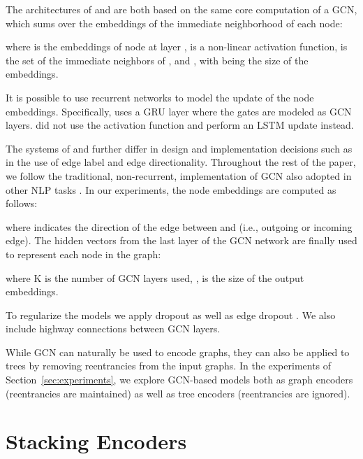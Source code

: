 \documentclass[11pt,a4paper]{article}
\begin{document}
The architectures of  and  are both based on the same core computation of a GCN, which sums over the embeddings of the immediate neighborhood of each node: 

where  is the embeddings of node  at layer ,  is a non-linear activation function,  is the set of the immediate neighbors of ,  and , with  being the size of the embeddings.
  
It is possible to use recurrent networks to model the update of the node embeddings. Specifically,  uses a GRU layer where the gates are modeled as GCN layers. 
 did not use the activation function  and perform an LSTM update instead. 

The systems of  and  further differ in design and implementation decisions such as in the use of edge label and edge directionality. 
Throughout the rest of the paper, we follow the traditional, non-recurrent, implementation of GCN also adopted in other NLP tasks \cite{marcheggiani2017encoding,bastings2017graph,cetoli2017graph}. In our experiments, the node embeddings are computed as follows:

where  indicates the direction of the edge between  and  (i.e., outgoing or incoming edge). 
The hidden vectors from the last layer of the GCN network are finally used to represent each node in the graph:

where K is the number of GCN layers used, ,  is the size of the output embeddings. 

To regularize the models we apply dropout \cite{srivastava2014dropout} as well as edge dropout \cite{marcheggiani2017encoding}. We also include highway connections \cite{srivastava2015highway} between GCN layers. 


While GCN can naturally be used to encode graphs, they can also be applied to trees by removing reentrancies from the input graphs. In the experiments of Section~\ref{sec:experiments}, we explore GCN-based models both as graph encoders (reentrancies are maintained) as well as tree encoders (reentrancies are ignored). 


\section{Stacking Encoders}
\label{sec:stack}
\end{document}
